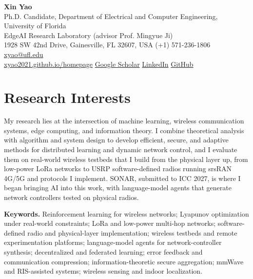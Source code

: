 \documentclass[10pt]{article}
\begin{document}
\begin{center}
{\LARGE\bfseries\color{accent} Xin Yao}\\[3pt]
Ph.D. Candidate, Department of Electrical and Computer Engineering, University of Florida\\
EdgeAI Research Laboratory (advisor Prof. Mingyue Ji)\\[2pt]
1928 SW 42nd Drive, Gainesville, FL 32607, USA \quad\textbullet\quad (+1) 571-236-1806 \quad\textbullet\quad \href{mailto:xyao@ufl.edu}{xyao@ufl.edu}\\
\href{https://xyao2021.github.io/homepage/}{xyao2021.github.io/homepage} \quad\textbullet\quad \href{https://scholar.google.com/citations?user=gwTaRUkAAAAJ&hl=en}{Google Scholar} \quad\textbullet\quad \href{https://www.linkedin.com/in/xin-yao-aa9249204/}{LinkedIn} \quad\textbullet\quad \href{https://github.com/XYao2021}{GitHub}
\end{center}

\section*{Research Interests}
My research lies at the intersection of machine learning, wireless communication systems, edge computing, and information theory. I combine theoretical analysis with algorithm and system design to develop efficient, secure, and adaptive methods for distributed learning and dynamic network control, and I evaluate them on real-world wireless testbeds that I build from the physical layer up, from low-power LoRa networks to USRP software-defined radios running srsRAN 4G/5G and protocols I implement. SONAR, submitted to ICC 2027, is where I began bringing AI into this work, with language-model agents that generate network controllers tested on physical radios.

\textbf{Keywords.} Reinforcement learning for wireless networks; Lyapunov optimization under real-world constraints; LoRa and low-power multi-hop networks; software-defined radio and physical-layer implementation; wireless testbeds and remote experimentation platforms; language-model agents for network-controller synthesis; decentralized and federated learning; error feedback and communication compression; information-theoretic secure aggregation; mmWave and RIS-assisted systems; wireless sensing and indoor localization.
\end{document}
